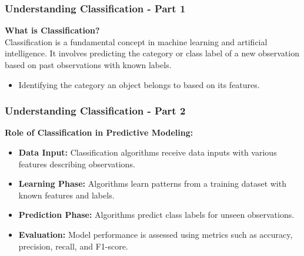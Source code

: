 \documentclass{beamer}
\begin{document}
\begin{frame}[fragile]
    \frametitle{Understanding Classification - Part 1}
    \textbf{What is Classification?} \\
    Classification is a fundamental concept in machine learning and artificial intelligence. It involves predicting the category or class label of a new observation based on past observations with known labels. 
    \begin{itemize}
        \item Identifying the category an object belongs to based on its features.
    \end{itemize}
\end{frame}

\begin{frame}[fragile]
    \frametitle{Understanding Classification - Part 2}
    \textbf{Role of Classification in Predictive Modeling:}
    \begin{itemize}
        \item \textbf{Data Input:} Classification algorithms receive data inputs with various features describing observations.
        \item \textbf{Learning Phase:} Algorithms learn patterns from a training dataset with known features and labels.
        \item \textbf{Prediction Phase:} Algorithms predict class labels for unseen observations.
        \item \textbf{Evaluation:} Model performance is assessed using metrics such as accuracy, precision, recall, and F1-score.
    \end{itemize}
\end{frame}
\end{document}
